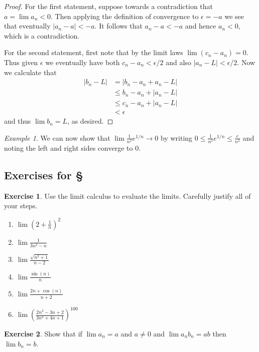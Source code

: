 \documentclass[11pt,oneside]{amsbook}
\theoremstyle{definition}
\newtheorem{exerc}{Exercise}[section]
\theoremstyle{plain}
\theoremstyle{definition}
\theoremstyle{remark}
\newtheorem{example}[theorem]{Example}
\numberwithin{equation}{section}
\numberwithin{figure}{section}
\begin{document}
\begin{proof}
  For the first statement, suppose towards a contradiction that $a=\lim a_n<0$. Then applying the definition of convergence to $\epsilon=-a$ we see that eventually $|a_n-a|<-a$. It follows that $a_n-a<-a$ and hence $a_n<0$, which is a contradiction.

  For the second statement, first note that by the limit laws $\lim(c_n-a_n)=0$. Thus given $\epsilon$ we eventually have both $c_n-a_n<\epsilon/2$ and also $|a_n-L|<\epsilon/2$. Now we calculate that
  \begin{align*}
    |b_n-L|&=|b_n-a_n+a_n-L|\\
    &\leq b_n-a_n+|a_n-L|\\
    &\leq c_n-a_n+|a_n-L|\\
    &<\epsilon
  \end{align*}
  and thus $\lim b_n=L$, as desired.
\end{proof}

\begin{example}
  We can now show that $\lim\frac{1}{n^2}e^{1/n}\to0$ by writing $0\leq\frac{1}{n^2}e^{1/n}\leq\frac{e}{n^2}$ and noting the left and right sides converge to $0$.
\end{example}

\newpage
\subsection*{Exercises for \S \thesection}

\begin{exerc}
  Use the limit calculus to evaluate the limits.  Carefully justify all of your steps.
  \begin{enumerate}
    \item $\lim(2+\frac1n)^2$
    \item $\lim\frac{1}{3n^2-n}$
    \item $\lim\frac{\sqrt{n^2+1}}{n-2}$
    \item $\lim\frac{\sin(n)}{n}$
    \item $\lim\frac{2n+\cos(n)}{n+2}$
    \item $\lim\left(\frac{2n^2-3n+2}{3n^2+4n+1}\right)^{100}$
  \end{enumerate}
\end{exerc}
  
\begin{exerc}
  Show that if $\lim a_n=a$ and $a\neq0$ and $\lim a_nb_n=ab$ then $\lim b_n=b$.
\end{exerc}
\end{document}
